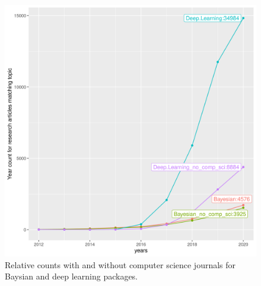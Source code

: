 \documentclass[AMA,STIX1COL]{WileyNJD-v2}
\begin{document}
\begin{figure}
    \centering
    \caption{Relative counts with and without computer science journals for Baysian and deep learning packages.}
    \label{fig:my_label}
    \includegraphics{CompSciVsNonCompSci}
\end{figure}
\end{document}
